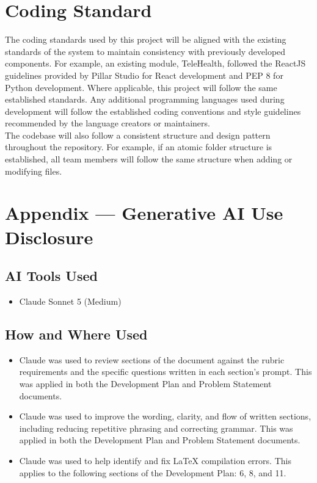 \documentclass{article}
\begin{document}
\section{Coding Standard} \label{sec:Code_Standard}

The coding standards used by this project will be aligned with the existing standards of the system to maintain consistency with previously developed components. For example, an existing module, TeleHealth, followed the ReactJS guidelines provided by Pillar Studio for React development and PEP 8 for Python development. Where applicable, this project will follow the same established standards.
Any additional programming languages used during development will follow the established coding conventions and style guidelines recommended by the language creators or maintainers.
\\The codebase will also follow a consistent structure and design pattern throughout the repository. For example, if an atomic folder structure is established, all team members will follow the same structure when adding or modifying files. 

\newpage{}

\section{Appendix --- Generative AI Use Disclosure}


\subsection{AI Tools Used}
\begin{itemize}
    \item Claude Sonnet 5 (Medium)
\end{itemize}

\subsection{How and Where Used}
\begin{itemize}
    \item Claude was used to review sections of the document against the rubric requirements and the specific questions written in each section's prompt. This was applied in both the Development Plan and Problem Statement documents.
    \item Claude was used to improve the wording, clarity, and flow of written sections, including reducing repetitive phrasing and correcting grammar. This was applied in both the Development Plan and Problem Statement documents.
    \item Claude was used to help identify and fix LaTeX compilation errors. This applies to the following sections of the Development Plan: 6, 8, and 11.
\end{itemize}
\end{document}
